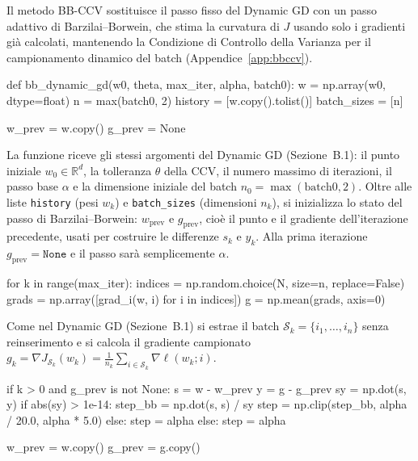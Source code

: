 \documentclass[italian, a4paper, twoside, binding=6mm]{sapthesis}
\begin{document}
Il metodo BB-CCV sostituisce il passo fisso del Dynamic GD con un passo
adattivo di Barzilai--Borwein, che stima la curvatura di $J$ usando solo i
gradienti già calcolati, mantenendo la Condizione di Controllo della Varianza
per il campionamento dinamico del batch (Appendice~\ref{app:bbccv}).

\begin{pythoncode}[title= BB-CCV]

def bb_dynamic_gd(w0, theta, max_iter, alpha, batch0):
    w = np.array(w0, dtype=float)
    n = max(batch0, 2)
    history     = [w.copy().tolist()]
    batch_sizes = [n]

    w_prev = w.copy()
    g_prev = None
\end{pythoncode}

La funzione riceve gli stessi argomenti del Dynamic GD (Sezione~B.1): il punto
iniziale $w_0 \in \mathbb{R}^d$, la tolleranza $\theta$ della CCV, il numero
massimo di iterazioni, il passo base $\alpha$ e la dimensione iniziale del
batch $n_0 = \max(\text{batch0}, 2)$. Oltre alle liste \texttt{history} (pesi
$w_k$) e \texttt{batch\_sizes} (dimensioni $n_k$), si inizializza lo stato del
passo di Barzilai--Borwein: $w_{\text{prev}}$ e $g_{\text{prev}}$, cioè il punto
e il gradiente dell'iterazione precedente, usati per costruire le differenze
$s_k$ e $y_k$. Alla prima iterazione $g_{\text{prev}} = \texttt{None}$ e il passo
sarà semplicemente $\alpha$.

\begin{pythoncode}[title= BB-CCV]

    for k in range(max_iter):
        indices = np.random.choice(N, size=n, replace=False)
        grads = np.array([grad_i(w, i) for i in indices])
        g = np.mean(grads, axis=0)
\end{pythoncode}

Come nel Dynamic GD (Sezione~B.1) si estrae il batch
$\mathcal{S}_k = \{i_1,\dots,i_n\}$ senza reinserimento e si calcola il
gradiente campionato
$g_k = \nabla J_{\mathcal{S}_k}(w_k) = \frac{1}{n_k}\sum_{i\in\mathcal{S}_k}\nabla\ell(w_k;i)$.

\begin{pythoncode}[title= BB-CCV]

        if k > 0 and g_prev is not None:
            s = w - w_prev
            y = g - g_prev
            sy = np.dot(s, y)
            if abs(sy) > 1e-14:
                step_bb = np.dot(s, s) / sy
                step = np.clip(step_bb, alpha / 20.0, alpha * 5.0)
            else:
                step = alpha
        else:
            step = alpha

        w_prev = w.copy()
        g_prev = g.copy()
\end{pythoncode}
\end{document}
